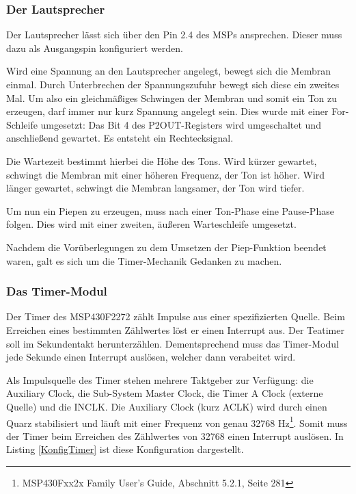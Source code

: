 \documentclass[12pt,a4paper,bibliography=totocnumbered,listof=totocnumbered]{scrartcl}
\begin{document}
\subsubsection{Der Lautsprecher}
\label{Lautsprecher}
Der Lautsprecher lässt sich über den Pin 2.4 des MSPs ansprechen. Dieser muss dazu als Ausgangspin konfiguriert werden.
\vspace{1em}


Wird eine Spannung an den Lautsprecher angelegt, bewegt sich die Membran einmal. Durch Unterbrechen der Spannungszufuhr bewegt sich diese ein zweites Mal. Um also ein gleichmäßiges Schwingen der Membran und somit ein Ton zu erzeugen, darf immer nur kurz Spannung angelegt sein. Dies wurde mit einer For-Schleife umgesetzt: Das Bit 4 des P2OUT-Registers wird umgeschaltet und anschließend gewartet. Es entsteht ein Rechtecksignal.

\vspace{1em}


Die Wartezeit bestimmt hierbei die Höhe des Tons. Wird kürzer gewartet, schwingt die Membran mit einer höheren Frequenz, der Ton ist höher. Wird länger gewartet, schwingt die Membran langsamer, der Ton wird tiefer.

Um nun ein Piepen zu erzeugen, muss nach einer Ton-Phase eine Pause-Phase folgen. Dies wird mit einer zweiten, äußeren Warteschleife umgesetzt.

\vspace{1em}


Nachdem die Vorüberlegungen zu dem Umsetzen der Piep-Funktion beendet waren, galt es sich um die Timer-Mechanik Gedanken zu machen.

\subsubsection{Das Timer-Modul}
\label{TeatimerTimerA}

Der Timer des MSP430F2272 zählt Impulse aus einer spezifizierten Quelle. Beim Erreichen eines bestimmten Zählwertes löst er einen Interrupt aus. Der Teatimer soll im Sekundentakt herunterzählen. Dementsprechend muss das Timer-Modul jede Sekunde einen Interrupt auslösen, welcher dann verabeitet wird. 

Als Impulsquelle des Timer stehen mehrere Taktgeber zur Verfügung: die Auxiliary Clock, die Sub-System Master Clock, die Timer A Clock (externe Quelle) und die INCLK. Die Auxiliary Clock (kurz ACLK) wird durch einen Quarz stabilisiert und läuft mit einer Frequenz von genau 32768 Hz\footnote{MSP430Fxx2x Family User's Guide, Abschnitt 5.2.1, Seite 281}. Somit muss der Timer beim Erreichen des Zählwertes von 32768 einen Interrupt auslösen. In Listing \ref{KonfigTimer} ist diese Konfiguration dargestellt.
\end{document}
